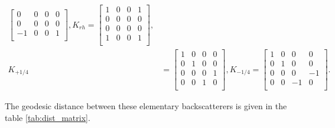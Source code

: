 \documentclass[conference]{IEEEtran}
\begin{document}
\begin{align*}
\begin{bmatrix}
0 & 0 & 0 & 0\\
0 & 0 & 0 & 0\\
-1 & 0 & 0 & 1\\
\end{bmatrix},
K_{rh}=
\begin{bmatrix}
1 & 0 & 0 & 1\\
0 & 0 & 0 & 0\\
0 & 0 & 0 & 0\\
1 & 0 & 0 & 1\\
\end{bmatrix}
,\\
K_{+1/4} &=
\begin{bmatrix}
1 & 0 & 0 & 0\\
0 & 1 & 0 & 0\\
0 & 0 & 0 & 1\\
0 & 0 & 1 & 0\\
\end{bmatrix},
K_{-1/4}=
\begin{bmatrix}
1 & 0 & 0 & 0\\
0 & 1 & 0 & 0\\
0 & 0 & 0 & -1\\
0 & 0 & -1 & 0\\
\end{bmatrix}
.
\end{align*}

The geodesic distance between these elementary backscatterers is given in the table \ref{tab:dist_matrix}.
\end{document}
